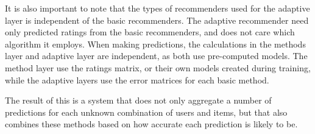 It is also important to note that the types of recommenders used for the adaptive layer
is independent of the basic recommenders.
The adaptive recommender need only predicted ratings from the basic recommenders,
and does not care which algorithm it employs.
When making predictions, the calculations in the methods layer and adaptive layer
are independent, as both use pre-computed models.
The method layer use the ratings matrix, or their own models
created during training, while the adaptive layers use the error matrices for each
basic method.

The result of this is a system that does not only aggregate a number of predictions for each unknown
combination of users and items,
but that also combines these methods based on how accurate each prediction is likely to be.


